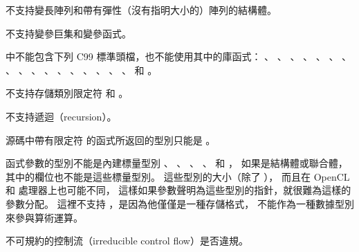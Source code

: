 \startitem
不支持變長陣列和帶有彈性（沒有指明大小的）陣列的結構體。
\stopitem

\startitem
不支持變參巨集和變參函式。
\stopitem

\startitem
{}中不能包含下列 C99 標準頭檔，也不能使用其中的庫函式：
 、 、 、 、
 、 、 、 、
 、 、 、 、
 、 、 、 、
 、  和 。
\stopitem

\startitem
不支持存儲類別限定符  和 。
\stopitem


\startitem
不支持遞迴（recursion）。
\stopitem

\startitem
源碼中帶有限定符  的函式所返回的型別只能是 。
\stopitem

\startitem
{}函式參數的型別不能是內建標量型別
 、 、 、 、
  和 ，
如果是結構體或聯合體，其中的欄位也不能是這些標量型別。
這些型別的大小（除了 ），
而且在 OpenCL  和  處理器上也可能不同，
這樣如果參數聲明為這些型別的指針，就很難為這樣的參數分配。
這裡不支持 ，是因為他僅僅是一種存儲格式，
不能作為一種數據型別來參與算術運算。
\stopitem

\startitem
不可規約的控制流（irreducible control flow）是否違規。
\stopitem

\stopigBig

